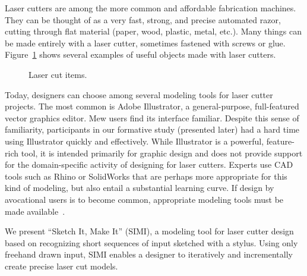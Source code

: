 \documentclass{article}
\begin{document}
Laser cutters are among the more common and affordable fabrication
machines. They can be thought of as a very fast, strong, and precise
automated razor, cutting through flat material (paper, wood, plastic,
metal, etc.). Many things can be made entirely with a laser cutter,
sometimes fastened with screws or glue.
Figure~\ref{fig:laser-example} shows several examples of useful objects
made with laser cutters.

\begin{figure}[b]
\centering 
{}
\caption{Laser cut items.}
\label{fig:laser-example}
\end{figure}



Today, designers can choose among several modeling tools for laser
cutter projects. The most common is Adobe Illustrator, a
general-purpose, full-featured vector graphics editor. Mew users find
its interface familiar. Despite this sense of familiarity,
participants in our formative study (presented later) had a hard time
using Illustrator quickly and effectively. While Illustrator is a
powerful, feature-rich tool, it is intended primarily for graphic
design and does not provide support for the domain-specific activity
of designing for laser cutters. Experts use CAD tools such as Rhino or
SolidWorks that are perhaps more appropriate for this kind of
modeling, but also entail a substantial learning curve. If design by
avocational users is to become common, appropriate modeling tools must
be made available~\cite{lipson-homefactory}.

We present ``Sketch It, Make It'' (SIMI), a modeling tool for laser
cutter design based on recognizing short sequences of input sketched
with a stylus. Using only freehand drawn input, SIMI enables a
designer to iteratively and incrementally create precise laser cut
models.
\end{document}
